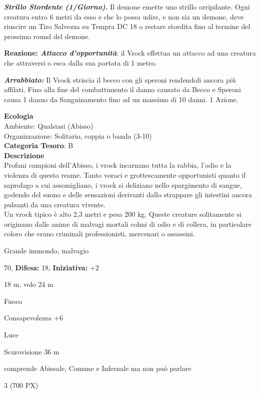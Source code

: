 \begin{multicols}{2}
{\emph{\textbf{Strillo Stordente (1/Giorno).}} Il demone emette uno strillo orripilante. Ogni creatura entro 6 metri da esso e che lo possa udire, e non sia un demone, deve riuscire un Tiro Salvezza su Tempra DC 18 o restare stordita fino al termine del prossimo round del demone.

\textbf{Reazione: \emph{Attacco d'opportunità}}: il Vrock effettua un attacco ad una creatura che attraversi o esca dalla sua portata di 1 metro.

\emph{\textbf{Arrabbiato:}} Il Vrock striscia il becco con gli speroni rendendoli ancora più affilati. Fino alla fine del combattimento il danno causato da Becco e Speroni causa 1 danno da Sanguinamento fino ad un massimo di 10 danni. 1 Azione.

\textbf{Ecologia}\\
Ambiente: Qualsiasi (Abisso)\\
Organizzazione: Solitario, coppia o banda (3-10)\\
\textbf{Categoria Tesoro}: B\\
\textbf{Descrizione}\\
Profani campioni dell'Abisso, i vrock incarnano tutta la rabbia, l'odio e la violenza di questo reame. Tanto voraci e grottescamente opportunisti quanto il saprofago a cui assomigliano, i vrock si deliziano nello spargimento di sangue, godendo del suono e delle sensazioni derivanti dallo strappare gli intestini ancora pulsanti da una creatura vivente.\\
Un vrock tipico è alto 2,3 metri e pesa 200 kg. Queste creature solitamente si originano dalle anime di malvagi mortali colmi di odio e di collera, in particolare coloro che erano criminali professionisti, mercenari o assassini.

\begin{description}[noitemsep, topsep=0pt, parsep=0pt, partopsep=0pt, leftmargin=0cm, labelwidth=2.2cm]
	\item[\textbf{Taglia/Tipo:}] Grande immondo, malvagio
	\item[\textbf{Caratt.:}] 
	\item[\textbf{Punti Ferita:}] 70,  \textbf{Difesa:} 18,  \textbf{Iniziativa:} +2
	\item[\textbf{Movimento:}] 18 m, volo 24 m
	\item[\textbf{Tiri Salvez.:}] 
	\item[\textbf{Imm. Danni:}] Fuoco
	\item[\textbf{Comp.:}] Consapevolezza +6
	\item[\textbf{Vulnerabilità:}] Luce
	\item[\textbf{Sensi:}] Scurovisione 36 m
	\item[\textbf{Linguaggi:}] comprende Abissale, Comune e Infernale ma non può parlare
	\item[\textbf{Sfida:}] 3 (700 PX)\smallskip
\end{description}

}
\end{multicols}
